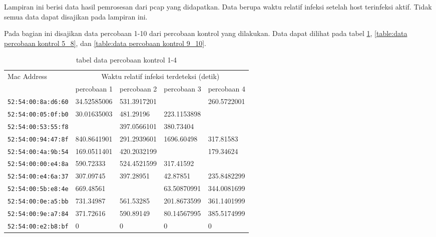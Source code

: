 
Lampiran ini berisi data hasil pemrosesan dari pcap yang didapatkan. Data berupa waktu relatif infeksi setelah host terinfeksi aktif. Tidak semua data dapat disajikan pada lampiran ini.


Pada bagian ini disajikan data percobaan 1-10 dari percobaan kontrol yang dilakukan. Data dapat dilihat pada tabel \ref{table:data percobaan kontrol 1_4}, \ref{table:data percobaan kontrol 5_8}, dan \ref{table:data percobaan kontrol 9_10}.

\begin{table}[H]
	\caption{tabel data percobaan kontrol 1-4}
	\label{table:data percobaan kontrol 1_4}
	\centering
	\footnotesize
	\begin{tabular}{|l|l|l|l|l|}
		\hline
		\multirow{2}{*}{Mac Address} & \multicolumn{4}{c|}{Waktu relatif infeksi terdeteksi (detik)} \\ \cline{2-5} 
		& percobaan 1 & percobaan 2 & percobaan 3 & percobaan 4\\ \hline
		\verb|52:54:00:8a:d6:60| & 34.52585006 & 531.3917201 &  & 260.5722001 \\ \hline
		\verb|52:54:00:05:0f:b0| & 30.01635003 & 481.29196 & 223.1153898 &  \\ \hline
		\verb|52:54:00:53:55:f8| &  & 397.0566101 & 380.73404 &  \\ \hline
		\verb|52:54:00:94:47:8f| & 840.8641901 & 291.2939601 & 1696.60498 & 317.81583 \\ \hline
		\verb|52:54:00:4a:9b:54| & 169.0511401 & 420.2032199 &  & 179.34624 \\ \hline
		\verb|52:54:00:00:e4:8a| & 590.72333 & 524.4521599 & 317.41592 &  \\ \hline
		\verb|52:54:00:e4:6a:37| & 307.09745 & 397.28951 & 42.87851 & 235.8482299 \\ \hline
		\verb|52:54:00:5b:e8:4e| & 669.48561 &  & 63.50870991 & 344.0081699 \\ \hline
		\verb|52:54:00:0e:a5:bb| & 731.34987 & 561.53285 & 201.8673599 & 361.1401999 \\ \hline
		\verb|52:54:00:9e:a7:84| & 371.72616 & 590.89149 & 80.14567995 & 385.5174999 \\ \hline
		\verb|52:54:00:e2:b8:bf| & 0 & 0 & 0 & 0 \\ \hline
	\end{tabular}
\end{table}
